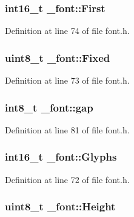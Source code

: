 \hypertarget{struct__font_a73decb2a2c2880dc782cd9cda5561876}{
\subsubsection[{First}]{\setlength{\rightskip}{0pt plus 5cm}int16\-\_\-t \-\_\-font\-::\-First}}\label{struct__font_a73decb2a2c2880dc782cd9cda5561876}


Definition at line 74 of file font.\-h.

\hypertarget{struct__font_a76218c6b35acb78926429f247cbaa687}{
\subsubsection[{Fixed}]{\setlength{\rightskip}{0pt plus 5cm}uint8\-\_\-t \-\_\-font\-::\-Fixed}}\label{struct__font_a76218c6b35acb78926429f247cbaa687}


Definition at line 73 of file font.\-h.

\hypertarget{struct__font_af4d840b8e62f6a0548cef0a5474416f4}{
\subsubsection[{gap}]{\setlength{\rightskip}{0pt plus 5cm}int8\-\_\-t \-\_\-font\-::gap}}\label{struct__font_af4d840b8e62f6a0548cef0a5474416f4}


Definition at line 81 of file font.\-h.

\hypertarget{struct__font_a1e89c06fc11a730eb602522dc8953491}{
\subsubsection[{Glyphs}]{\setlength{\rightskip}{0pt plus 5cm}int16\-\_\-t \-\_\-font\-::\-Glyphs}}\label{struct__font_a1e89c06fc11a730eb602522dc8953491}


Definition at line 72 of file font.\-h.

\hypertarget{struct__font_a5888921d1a78bf917351a275e2033467}{
\subsubsection[{Height}]{\setlength{\rightskip}{0pt plus 5cm}uint8\-\_\-t \-\_\-font\-::\-Height}}\label{struct__font_a5888921d1a78bf917351a275e2033467}


